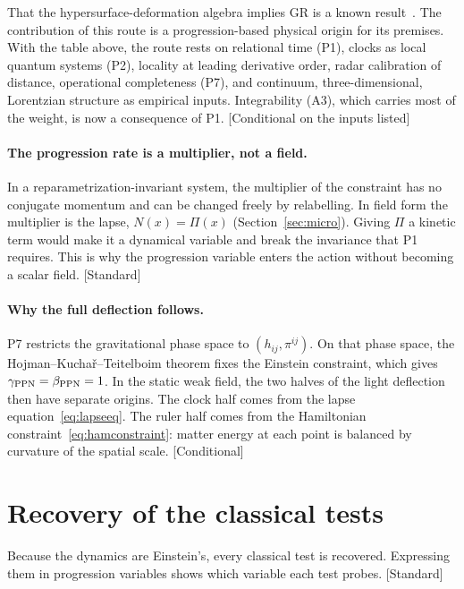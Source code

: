 \documentclass[11pt]{article}
\newcommand{\Pg}{\Pi}                 %
\newcommand{\st}[1]{\textsf{\small[#1]}}
\theoremstyle{plain}
\theoremstyle{definition}
\theoremstyle{remark}
\begin{document}
That the hypersurface-deformation algebra implies GR is a known result~\cite{HKT1976}. The contribution of this route is a progression-based physical origin for its premises. With the table above, the route rests on relational time (P1), clocks as local quantum systems (P2), locality at leading derivative order, radar calibration of distance, operational completeness (P7), and continuum, three-dimensional, Lorentzian structure as empirical inputs. Integrability (A3), which carries most of the weight, is now a consequence of P1. \st{Conditional on the inputs listed}

\paragraph{The progression rate is a multiplier, not a field.}
In a reparametrization-invariant system, the multiplier of the constraint has no conjugate momentum and can be changed freely by relabelling. In field form the multiplier is the lapse, $N(x)=\Pg(x)$ (Section~\ref{sec:micro}). Giving $\Pg$ a kinetic term would make it a dynamical variable and break the invariance that P1 requires. This is why the progression variable enters the action without becoming a scalar field. \st{Standard}

\paragraph{Why the full deflection follows.}
P7 restricts the gravitational phase space to $(h_{ij},\pi^{ij})$. On that phase space, the Hojman--Kucha\v{r}--Teitelboim theorem fixes the Einstein constraint, which gives $\gamma_{\rm PPN}=\beta_{\rm PPN}=1$. In the static weak field, the two halves of the light deflection then have separate origins. The clock half comes from the lapse equation~\eqref{eq:lapseeq}. The ruler half comes from the Hamiltonian constraint~\eqref{eq:hamconstraint}: matter energy at each point is balanced by curvature of the spatial scale. \st{Conditional}

\section{Recovery of the classical tests}
\label{sec:tests}

Because the dynamics are Einstein's, every classical test is recovered. Expressing them in progression variables shows which variable each test probes. \st{Standard}
\end{document}
